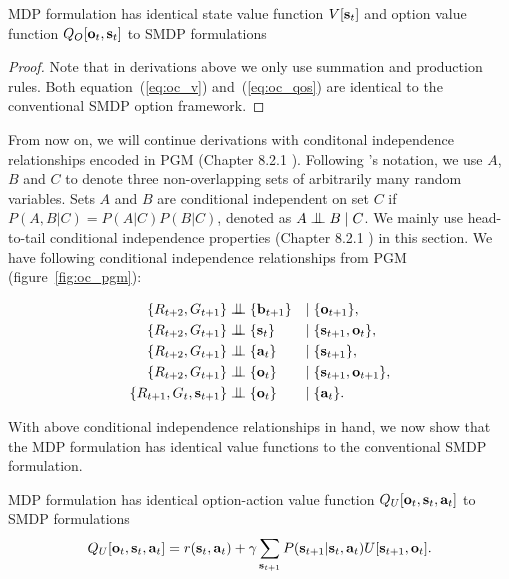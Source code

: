 \begin{prop}
  \label{prop:oc_q_soa}
  MDP formulation has identical state value function $V[{\mathbf{s}}_t]$
  and option value function $Q_O[{\mathbf{o}}_t,{\mathbf{s}}_t]$ to SMDP
  formulations
\end{prop}

\begin{proof}
  Note that in derivations above we only use summation and
  production rules. Both equation~(\ref{eq:oc_v})
  and~(\ref{eq:oc_qos}) are identical to the conventional SMDP
  option framework.
\end{proof}

From now on, we will continue derivations with conditonal
independence relationships encoded in PGM (Chapter 8.2.1
\cite{bishop2006pattern}). Following
's notation, we use $A$, $B$ and $C$
to denote three non-overlapping sets of arbitrarily many random
variables. Sets $A$ and $B$ are conditional independent on set
$C$ if $P(A,B|C)=P(A|C)P(B|C)$, denoted as $A\bigCI B \;|\; C$.
We mainly use head-to-tail conditional independence properties
(Chapter 8.2.1 \cite{bishop2006pattern}) in this section. We have
following conditional independence relationships from PGM
(figure~\ref{fig:oc_pgm}):


\begin{align}
\label{eq:c1}  \{R_{t+2},G_{t+1}\}&\bigCI \{\rvb_{t+1}\} &|\;&\{\rvo_{t+1}\},\\
\label{eq:c2} \{R_{t+2},G_{t+1}\}&\bigCI \{\rvs_t\} &|\;&\{\rvs_{t+1},\rvo_t\},\\
\label{eq:c3}  \{R_{t+2},G_{t+1}\}&\bigCI \{\rva_t\} &|\;&\{\rvs_{t+1}\},\\
\label{eq:c4}  \{R_{t+2},G_{t+1}\}&\bigCI \{\rvo_t\} &|\;&\{\rvs_{t+1},\rvo_{t+1}\},\\
\label{eq:c5}  \{R_{t+1},G_{t},\rvs_{t+1}\}&\bigCI \{\rvo_t\} &|\;&\{\rva_{t}\}.
\end{align}

With above conditional independence relationships in hand, we now
show that the MDP formulation has identical value functions to
the conventional SMDP
formulation\cite{sutton1999between,bacon2017option}.

\begin{prop}
  \label{prop:oc_q_soa}
  MDP formulation has identical option-action value function
  $Q_U[{\mathbf{o}}_t, {\mathbf{s}}_t,{\mathbf{a}}_t]$ to SMDP formulations
\begin{equation}
  \label{eq:oc_q_soa}
  Q_U[{\mathbf{o}}_t, {\mathbf{s}}_t,{\mathbf{a}}_t]=r({\mathbf{s}}_t,{\mathbf{a}}_t)+\gamma\sum_{{\mathbf{s}}_{t+1}}P({\mathbf{s}}_{t+1}|{\mathbf{s}}_t,{\mathbf{a}}_t)U[{\mathbf{s}}_{t+1},{\mathbf{o}}_t].
\end{equation}
\end{prop}

